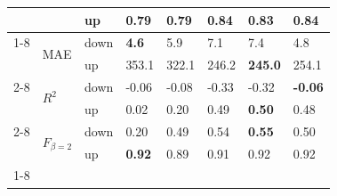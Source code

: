 \begin{table}
\begin{tabular}{llllllll}
 &  & up & 0.79 & 0.79 & \textbf{0.84} & 0.83 & 0.84 \\
\cline{1-8} \cline{2-8}
\multirow[t]{6}{*}{TransnetBW} & \multirow[t]{2}{*}{MAE} & down & \textbf{4.6} & 5.9 & 7.1 & 7.4 & 4.8 \\
 &  & up & 353.1 & 322.1 & 246.2 & \textbf{245.0} & 254.1 \\
\cline{2-8}
 & \multirow[t]{2}{*}{$R^2$} & down & -0.06 & -0.08 & -0.33 & -0.32 & \textbf{-0.06} \\
 &  & up & 0.02 & 0.20 & 0.49 & \textbf{0.50} & 0.48 \\
\cline{2-8}
 & \multirow[t]{2}{*}{$F_{\beta=2}$} & down & 0.20 & 0.49 & 0.54 & \textbf{0.55} & 0.50 \\
 &  & up & \textbf{0.92} & 0.89 & 0.91 & 0.92 & 0.92 \\
\cline{1-8} \cline{2-8}
\bottomrule
\end{tabular}
\end{table}
